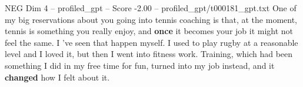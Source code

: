 \begin{textsample}{NEG Dim 4 – profiled\_gpt – Score -2.00 – profiled\_gpt/t000181\_gpt.txt}  \label{ex:f4_neg_016}
One of my big reservations about you going into tennis coaching is that, at the moment, tennis is something you really enjoy, and \textbf{once} it becomes your job it might not feel the same.
I ’ve seen that happen myself.
I used to play rugby at a reasonable level and I loved it, but then I went into fitness work.
Training, which had been something I did in my free time for fun, turned into my job instead, and it \textbf{changed} how I felt about it.

\end{textsample}
